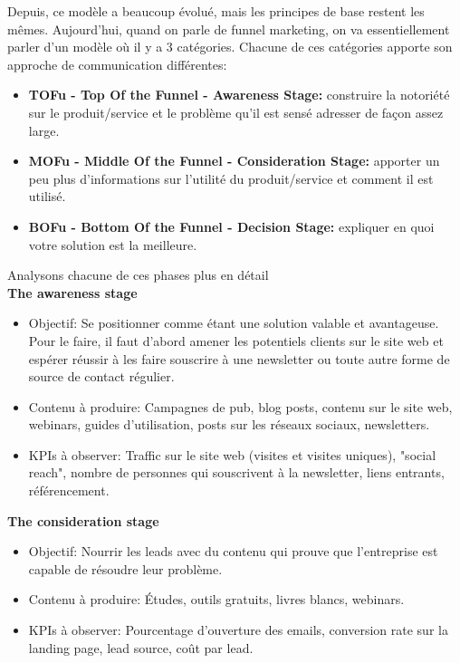 Depuis, ce modèle a beaucoup évolué, mais les principes de base restent les mêmes. Aujourd'hui, quand on parle de funnel marketing, on va essentiellement parler d'un modèle où il y a 3 catégories. Chacune de ces catégories apporte son approche de communication différentes:

\begin{itemize}
    \item \textbf{TOFu - Top Of the Funnel - Awareness Stage:} construire la notoriété sur le produit/service et le problème qu'il est sensé adresser de façon assez large.
    \item \textbf{MOFu - Middle Of the Funnel - Consideration Stage:} apporter un peu plus d'informations sur l'utilité du produit/service et comment il est utilisé.
    \item \textbf{BOFu - Bottom Of the Funnel - Decision Stage:} expliquer en quoi votre solution est la meilleure. \\
\end{itemize}

Analysons chacune de ces phases plus en détail\\

\textbf{The awareness stage}

\begin{itemize}
    \item Objectif: Se positionner comme étant une solution valable et avantageuse. Pour le faire, il faut d'abord amener les potentiels clients sur le site web et espérer réussir à les faire souscrire à une newsletter ou toute autre forme de source de contact régulier.
    \item Contenu à produire: Campagnes de pub, blog posts, contenu sur le site web, webinars, guides d'utilisation, posts sur les réseaux sociaux, newsletters.
    \item KPIs à observer: Traffic sur le site web (visites et visites uniques), "social reach", nombre de personnes qui souscrivent à la newsletter, liens entrants, référencement.\\
\end{itemize}

\textbf{The consideration stage}

\begin{itemize}
    \item Objectif: Nourrir les leads avec du contenu qui prouve que l'entreprise est capable de résoudre leur problème.
    \item Contenu à produire: Études, outils gratuits, livres blancs, webinars.
    \item KPIs à observer: Pourcentage d'ouverture des emails, conversion rate sur la landing page, lead source, coût par lead.\\
\end{itemize}

